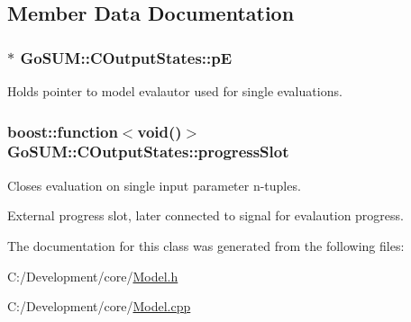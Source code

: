 \subsection{Member Data Documentation}
\hypertarget{class_go_s_u_m_1_1_c_output_states_ace5684dae11c9a0d432daddd623d8b62}{
\subsubsection[{p\-E}]{$\ast$ Go\-S\-U\-M\-::\-C\-Output\-States\-::p\-E\hspace{0.3cm}{\ttfamily [private]}}}\label{class_go_s_u_m_1_1_c_output_states_ace5684dae11c9a0d432daddd623d8b62}
Holds pointer to model evalautor used for single evaluations. \hypertarget{class_go_s_u_m_1_1_c_output_states_af87022e02d37a1ed2c804776f15b30b7}{
\subsubsection[{progress\-Slot}]{\setlength{\rightskip}{0pt plus 5cm}boost\-::function$<$void()$>$ Go\-S\-U\-M\-::\-C\-Output\-States\-::progress\-Slot}}\label{class_go_s_u_m_1_1_c_output_states_af87022e02d37a1ed2c804776f15b30b7}


Closes evaluation on single input parameter n-\/tuples. 

External progress slot, later connected to signal for evalaution progress. 

The documentation for this class was generated from the following files\-:\begin{DoxyCompactItemize}
\item 
C\-:/\-Development/core/\hyperlink{_model_8h}{Model.\-h}\item 
C\-:/\-Development/core/\hyperlink{_model_8cpp}{Model.\-cpp}\end{DoxyCompactItemize}
